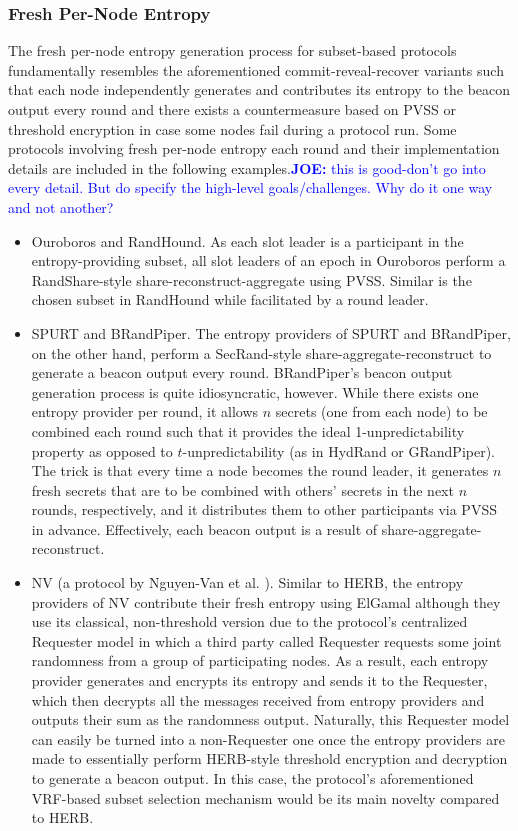 \documentclass[letterpaper,twocolumn,10pt]{article}
\theoremstyle{definition}
\theoremstyle{remark}
\newcommand{\joenote}[1]{\textcolor{blue}{\textbf{JOE:} #1}}
\begin{document}
\subsubsection{Fresh Per-Node Entropy}
\label{subsubsection:fresh}
The fresh per-node entropy generation process for subset-based protocols fundamentally resembles the aforementioned commit-reveal-recover variants such that each node independently generates and contributes its entropy to the beacon output every round and there exists a countermeasure based on PVSS or threshold encryption in case some nodes fail during a protocol run. Some protocols involving fresh per-node entropy each round and their implementation details are included in the following examples.\joenote{this is good-don't go into every detail. But do specify the high-level goals/challenges. Why do it one way and not another?}
\begin{itemize}
\item Ouroboros and RandHound. As each slot leader is a participant in the entropy-providing subset, all slot leaders of an epoch in Ouroboros perform a RandShare-style share-reconstruct-aggregate using PVSS. Similar is the chosen subset in RandHound while facilitated by a round leader.
\item SPURT and BRandPiper. The entropy providers of SPURT and BRandPiper, on the other hand, perform a SecRand-style share-aggregate-reconstruct to generate a beacon output every round. BRandPiper's beacon output generation process is quite idiosyncratic, however. While there exists one entropy provider per round, it allows $n$ secrets (one from each node) to be combined each round such that it provides the ideal 1-unpredictability property as opposed to $t$-unpredictability (as in HydRand or GRandPiper). The trick is that every time a node becomes the round leader, it generates $n$ fresh secrets that are to be combined with others' secrets in the next $n$ rounds, respectively, and it distributes them to other participants via PVSS in advance. Effectively, each beacon output is a result of share-aggregate-reconstruct.
\item NV (a protocol by Nguyen-Van et al. \cite{nguyen2019scalable}). Similar to HERB, the entropy providers of NV contribute their fresh entropy using ElGamal although they use its classical, non-threshold version due to the protocol's centralized Requester model in which a third party called Requester requests some joint randomness from a group of participating nodes. As a result, each entropy provider generates and encrypts its entropy and sends it to the Requester, which then decrypts all the messages received from entropy providers and outputs their sum as the randomness output. Naturally, this Requester model can easily be turned into a non-Requester one once the entropy providers are made to essentially perform HERB-style threshold encryption and decryption to generate a beacon output. In this case, the protocol's aforementioned VRF-based subset selection mechanism would be its main novelty compared to HERB.
\end{itemize}
\end{document}
